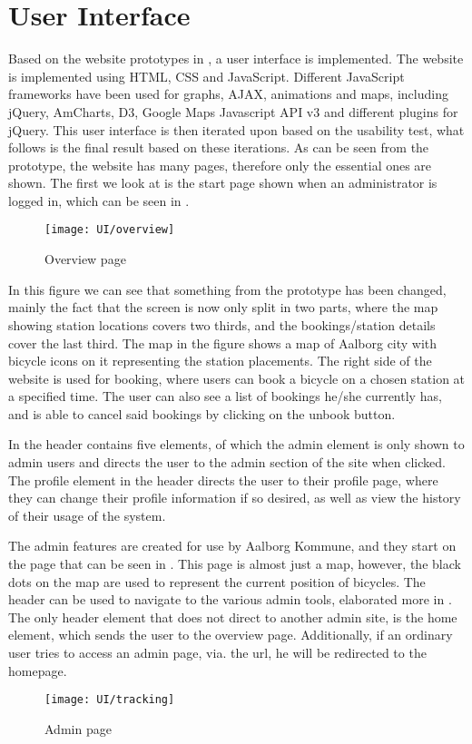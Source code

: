 \section{User Interface}

Based on the website prototypes in , a user interface is implemented.
The website is implemented using HTML, CSS and JavaScript. 
Different JavaScript frameworks have been used for graphs, AJAX, animations and maps, including jQuery, AmCharts, D3, Google Maps Javascript API v3 and different plugins for jQuery.
This user interface is then iterated upon based on the usability test, what follows is the final result based on these iterations. 
As can be seen from the prototype, the website has many pages, therefore only the essential ones are shown.
The first we look at is the start page shown when an administrator is logged in, which can be seen in .

\begin{figure}[h]
	\centering
	\texttt{[image: UI/overview]}
	\caption{Overview page}\label{fig:UI-overview}
\end{figure}

In this figure we can see that something from the prototype has been changed, mainly the fact that the screen is now only split in two parts, where the map showing station locations covers two thirds, and the bookings/station details cover the last third.
The map in the figure shows a map of Aalborg city with bicycle icons on it representing the station placements.
The right side of the website is used for booking, where users can book a bicycle on a chosen station at a specified time.
The user can also see a list of bookings he/she currently has, and is able to cancel said bookings by clicking on the unbook button.

In  the header contains five elements, of which the admin element is only shown to admin users and directs the user to the admin section of the site when clicked.
The profile element in the header directs the user to their profile page, where they can change their profile information if so desired, as well as view the history of their usage of the system.


The admin features are created for use by Aalborg Kommune, and they start on the page that can be seen in .
This page is almost just a map, however, the black dots on the map are used to represent the current position of bicycles.
The header can be used to navigate to the various admin tools, elaborated more in .
The only header element that does not direct to another admin site, is the home element, which sends the user to the overview page.
Additionally, if an ordinary user tries to access an admin page, via. the url, he will be redirected to the homepage.

\begin{figure}[h]
	\centering
	\texttt{[image: UI/tracking]}
	\caption{Admin page}\label{fig:UI-admin}
\end{figure}

